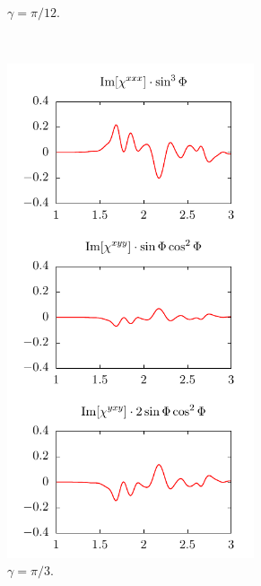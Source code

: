 \documentclass[aps,prb,10pt,letterpaper,notitlepage]{revtex4-1}
\begin{document}
\begin{figure}[b]
\begin{subfigure}[b]{0.25\textwidth}
        \caption{$\gamma = \pi/12$.}
    \end{subfigure}
    ~ 
    \begin{subfigure}[b]{0.25\textwidth}
        \includegraphics[width=0.8\textwidth]{fig03b}
        \caption{$\gamma = \pi/3$.}
    \end{subfigure}
    ~ 
    \begin{subfigure}[b]{0.25\textwidth}

\end{subfigure}
\end{figure}
\end{document}

